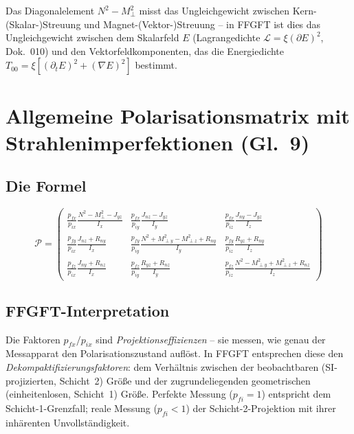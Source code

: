 Das Diagonalelement $N^2 - M_\perp^2$ misst das Ungleichgewicht zwischen
Kern-(Skalar-)Streuung und Magnet-(Vektor-)Streuung -- in FFGFT ist dies das
Ungleichgewicht zwischen dem Skalarfeld $E$ (Lagrangedichte
$\mathcal{L}=\xi(\partial E)^2$, Dok.~010) und den Vektorfeldkomponenten,
das die Energiedichte $T_{00} = \xi[(\partial_t E)^2 + (\nabla E)^2]$
bestimmt.

\section{Allgemeine Polarisationsmatrix mit Strahlenimperfektionen (Gl.~9)}

\subsection*{Die Formel}

\begin{equation}
  \mathcal{P} =
  \begin{pmatrix}
    \frac{p_{fx}}{p_{ix}}\frac{N^2-M_\perp^2-J_{yz}}{I_x} &
    \frac{p_{fx}}{p_{iy}}\frac{J_{nz}-J_{yz}}{I_y} &
    \frac{p_{fx}}{p_{iz}}\frac{J_{ny}-J_{yz}}{I_z} \\[6pt]
    \frac{p_{fy}}{p_{ix}}\frac{J_{nz}+R_{ny}}{I_x} &
    \frac{p_{fy}}{p_{iy}}\frac{N^2+M_{\perp y}^2-M_{\perp z}^2+R_{ny}}{I_y} &
    \frac{p_{fy}}{p_{iz}}\frac{R_{yz}+R_{ny}}{I_z} \\[6pt]
    \frac{p_{fz}}{p_{ix}}\frac{J_{ny}+R_{nz}}{I_x} &
    \frac{p_{fz}}{p_{iy}}\frac{R_{yz}+R_{nz}}{I_y} &
    \frac{p_{fz}}{p_{iz}}\frac{N^2-M_{\perp y}^2+M_{\perp z}^2+R_{nz}}{I_z}
  \end{pmatrix}
  \tag{Ref.~Gl.~9}
\end{equation}

\subsection*{FFGFT-Interpretation}

Die Faktoren $p_{fx}/p_{ix}$ sind \emph{Projektionseffizienzen} -- sie messen,
wie genau der Messapparat den Polarisationszustand auflöst. In FFGFT
entsprechen diese den \emph{Dekompaktifizierungsfaktoren}: dem Verhältnis
zwischen der beobachtbaren (SI-projizierten, Schicht~2) Größe und der
zugrundeliegenden geometrischen (einheitenlosen, Schicht~1) Größe.
Perfekte Messung ($p_{fi} = 1$) entspricht dem Schicht-1-Grenzfall;
reale Messung ($p_{fi} < 1$) der Schicht-2-Projektion mit ihrer inhärenten
Unvollständigkeit.

